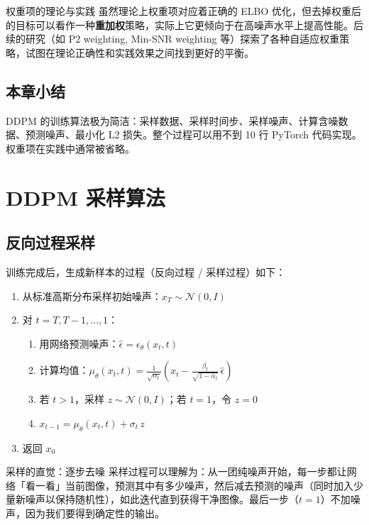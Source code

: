 \documentclass[a4paper]{article}
\begin{document}
\begin{knowledgebox}{权重项的理论与实践}
虽然理论上权重项对应着正确的 ELBO 优化，但去掉权重后的目标可以看作一种\textbf{重加权}策略，实际上它更倾向于在高噪声水平上提高性能。后续的研究（如 P2 weighting, Min-SNR weighting 等）探索了各种自适应权重策略，试图在理论正确性和实践效果之间找到更好的平衡。
\end{knowledgebox}

\subsection{本章小结}

DDPM 的训练算法极为简洁：采样数据、采样时间步、采样噪声、计算含噪数据、预测噪声、最小化 L2 损失。整个过程可以用不到 10 行 PyTorch 代码实现。权重项在实践中通常被省略。


\section{DDPM 采样算法}

\subsection{反向过程采样}

训练完成后，生成新样本的过程（反向过程 / 采样过程）如下：

\begin{enumerate}
    \item 从标准高斯分布采样初始噪声：$x_T \sim \mathcal{N}(0, I)$
    \item 对 $t = T, T-1, \dots, 1$：
    \begin{enumerate}
        \item 用网络预测噪声：$\hat{\epsilon} = \epsilon_\theta(x_t, t)$
        \item 计算均值：$\mu_\theta(x_t, t) = \frac{1}{\sqrt{\alpha_t}}\left(x_t - \frac{\beta_t}{\sqrt{1-\bar{\alpha}_t}}\, \hat{\epsilon}\right)$
        \item 若 $t > 1$，采样 $z \sim \mathcal{N}(0, I)$；若 $t = 1$，令 $z = 0$
        \item $x_{t-1} = \mu_\theta(x_t, t) + \sigma_t\, z$
    \end{enumerate}
    \item 返回 $x_0$
\end{enumerate}

\begin{importantbox}{采样的直觉：逐步去噪}
采样过程可以理解为：从一团纯噪声开始，每一步都让网络「看一看」当前图像，预测其中有多少噪声，然后减去预测的噪声（同时加入少量新噪声以保持随机性），如此迭代直到获得干净图像。最后一步（$t=1$）不加噪声，因为我们要得到确定性的输出。
\end{importantbox}
\end{document}
